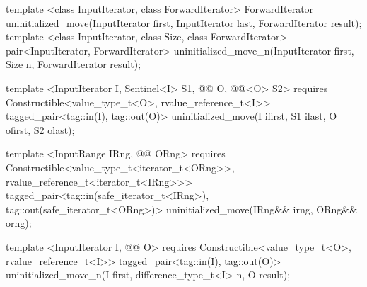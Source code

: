 {\color{remclr}
\begin{codeblock}
template <class InputIterator, class ForwardIterator>
  ForwardIterator uninitialized_move(InputIterator first, InputIterator last,
                                     ForwardIterator result);
template <class InputIterator, class Size, class ForwardIterator>
  pair<InputIterator, ForwardIterator>
    uninitialized_move_n(InputIterator first, Size n, ForwardIterator result);
\end{codeblock}
} %
{\color{addclr}
\begin{codeblock}
template <InputIterator I, Sentinel<I> S1, @@ O, @@<O> S2>
requires
  Constructible<value_type_t<O>, rvalue_reference_t<I>>
tagged_pair<tag::in(I), tag::out(O)>
  uninitialized_move(I ifirst, S1 ilast, O ofirst, S2 olast);

template <InputRange IRng, @@ ORng>
  requires
Constructible<value_type_t<iterator_t<ORng>>, rvalue_reference_t<iterator_t<IRng>>>
  tagged_pair<tag::in(safe_iterator_t<IRng>), tag::out(safe_iterator_t<ORng>)>
uninitialized_move(IRng&& irng, ORng&& orng);

template <InputIterator I, @@ O>
  requires
Constructible<value_type_t<O>, rvalue_reference_t<I>>
  tagged_pair<tag::in(I), tag::out(O)>
uninitialized_move_n(I first, difference_type_t<I> n, O result);
\end{codeblock}
} %

